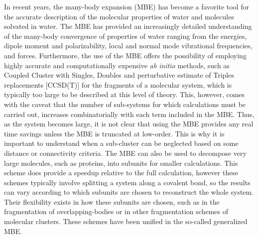 \documentclass[11pt, proquest]{uwthesis}[2020/02/24]
\begin{document}
\par In recent years, the many-body expansion (MBE) has become a favorite tool for the accurate description of the molecular properties of water and molecules solvated in water. The MBE has provided an increasingly detailed understanding of the many-body convergence of properties of water ranging from the energies\autocite{xantheas_ab_1994, pedulla_theoretical_1998}, dipole moment and polarizability\autocite{medders_many-body_2013}, local and normal mode vibrational frequencies\autocite{heindel_origin_2018, howard_n-body_2013}, and forces\autocite{bates_efficient_2011, demerdash_convergence_2016, demerdash_assessing_2017}. Furthermore, the use of the MBE offers the possibility of employing highly accurate and computationally expensive \textit{ab initio} methods, such as Coupled Cluster with Singles, Doubles and perturbative estimate of Triples replacements [CCSD(T)] for the fragments of a molecular system, which is typically too large to be described at this level of theory. This, however, comes with the caveat that the number of sub-systems for which calculations must be carried out, increases combinatorially with each term included in the MBE. Thus, as the system becomes large, it is not clear that using the MBE provides any real time savings unless the MBE is truncated at low-order. This is why it is important to understand when a sub-cluster can be neglected based on some distance or connectivity criteria.\autocite{cui_theoretical_2006, ouyang_when_2016} The MBE can also be used to decompose very large molecules, such as proteins, into subunits for smaller calculations.\autocite{mayhall_many-overlapping-body_2012, richard_many-body_2013} This scheme does provide a speedup relative to the full calculation, however these schemes typically involve splitting a system along a covalent bond, so the results can vary according to which subunits are chosen to reconstruct the whole system. Their flexibility exists in how these subunits are chosen, such as in the fragmentation of overlapping-bodies or in other fragmentation schemes of molecular clusters. These schemes have been unified in the so-called generalized MBE.\autocite{richard_generalized_2012}
\end{document}
